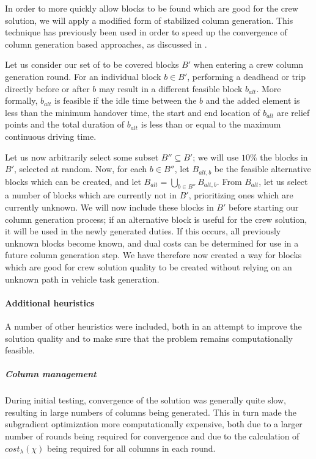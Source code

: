 \documentclass[]{article}
\begin{document}
In order to more quickly allow blocks to be found which are good for the crew solution, we will apply a modified form of stabilized column generation. This technique has previously been used in order to speed up the convergence of column generation based approaches, as discussed in \citet{DuMerle1999}. 

Let us consider our set of to be covered blocks $B'$ when entering a crew column generation round. For an individual block $b \in B'$, performing a deadhead or trip directly before or after $b$ may result in a different feasible block $b_{alt}$. More formally, $b_{alt}$ is feasible if the idle time between the $b$ and the added element is less than the minimum handover time, the start and end location of $b_{alt}$ are relief points and the total duration of $b_{alt}$ is less than or equal to the maximum continuous driving time.

Let us now arbitrarily select some subset $B'' \subseteq B'$; we will use $10\%$ the blocks in $B'$, selected at random. Now, for each $b \in B''$, let $B_{alt,b}$ be the feasible alternative blocks which can be created, and let $B_{alt} = \bigcup_{b \in B''} B_{alt,b}$. From $B_{alt}$, let us select a number of blocks which are currently not in $B'$, prioritizing ones which are currently unknown. We will now include these blocks in $B'$ before starting our column generation process; if an alternative block is useful for the crew solution, it will be used in the newly generated duties. If this occurs, all previously unknown blocks become known, and dual costs can be determined for use in a future column  generation step. We have therefore now created a way for blocks which are good for crew solution quality to be created without relying on an unknown path in vehicle task generation.

\paragraph{Additional heuristics}
A number of other heuristics were included, both in an attempt to improve the solution quality and to make sure that the problem remains computationally feasible.

\subparagraph{Column management} During initial testing, convergence of the solution was generally quite slow, resulting in large numbers of columns being generated. This in turn made the subgradient optimization more computationally expensive, both due to a larger number of rounds being required for convergence and due to the calculation of $cost_\lambda(\chi)$ being required for all columns in each round. 
\end{document}
